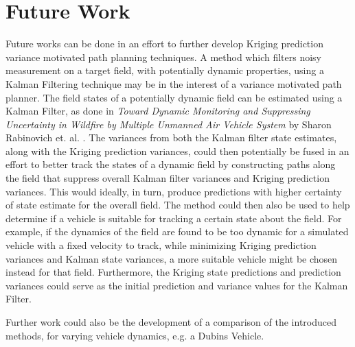 \chapter*{Future Work}
Future works can be done in an effort to further develop Kriging prediction variance motivated path planning techniques. A method which filters noisy measurement on a target field, with potentially dynamic properties, using a Kalman Filtering technique may be in the interest of a variance motivated path planner. The field states of a potentially dynamic field can be estimated using a Kalman Filter, as done in \textit{Toward Dynamic Monitoring and Suppressing Uncertainty in Wildfire by Multiple Unmanned Air Vehicle System} by Sharon Rabinovich et. al. \cite{sharon:jor}. The variances from both the Kalman filter state estimates, along with the Kriging prediction variances, could then potentially be fused in an effort to better track the states of a dynamic field by constructing paths along the field that suppress overall Kalman filter variances and Kriging prediction variances. This would ideally, in turn, produce predictions with higher certainty of state estimate for the overall field. The method could then also be used to help determine if a vehicle is suitable for tracking a certain state about the field. For example, if the dynamics of the field are found to be too dynamic for a simulated vehicle with a fixed velocity to track, while minimizing Kriging prediction variances and Kalman state variances, a more suitable vehicle might be chosen instead for that field. Furthermore, the Kriging state predictions and prediction variances could serve as the initial prediction and variance values for the Kalman Filter.

Further work could also be the development of a comparison of the introduced methods, for varying vehicle dynamics, e.g. a Dubins Vehicle.